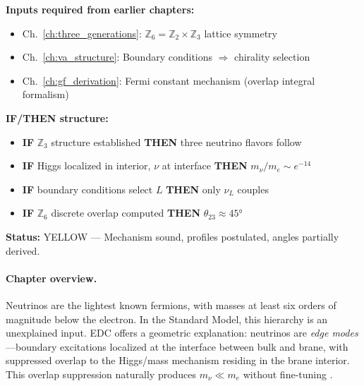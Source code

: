 \begin{tcolorbox}[colback=blue!5!white, colframe=blue!50!black,
    title=\textbf{Dependency \& Status}]
\textbf{Inputs required from earlier chapters:}
\begin{itemize}[nosep]
    \item Ch.~\ref{ch:three_generations}: $\mathbb{Z}_6 = \mathbb{Z}_2 \times \mathbb{Z}_3$ lattice symmetry
    \item Ch.~\ref{ch:va_structure}: Boundary conditions $\Rightarrow$ chirality selection
    \item Ch.~\ref{ch:gf_derivation}: Fermi constant mechanism (overlap integral formalism)
\end{itemize}

\textbf{IF/THEN structure:}
\begin{itemize}[nosep]
    \item \textbf{IF} $\mathbb{Z}_3$ structure established \textbf{THEN} three neutrino flavors follow \tagI{}
    \item \textbf{IF} Higgs localized in interior, $\nu$ at interface \textbf{THEN} $m_\nu/m_e \sim e^{-14}$ \tagDc{}
    \item \textbf{IF} boundary conditions select $L$ \textbf{THEN} only $\nu_L$ couples \tagDc{}
    \item \textbf{IF} $\mathbb{Z}_6$ discrete overlap computed \textbf{THEN} $\theta_{23} \approx 45°$ \tagDc{}
\end{itemize}

\textbf{Status:} YELLOW --- Mechanism sound, profiles postulated, angles partially derived.
\end{tcolorbox}


\paragraph{Chapter overview.}
Neutrinos are the lightest known fermions, with masses at least six orders of
magnitude below the electron. In the Standard Model, this hierarchy is an
unexplained input. EDC offers a geometric explanation: neutrinos are
\emph{edge modes}---boundary excitations localized at the interface between
bulk and brane, with suppressed overlap to the Higgs/mass mechanism residing
in the brane interior. This overlap suppression naturally produces $m_\nu \ll m_e$
without fine-tuning \tagDc{}.

